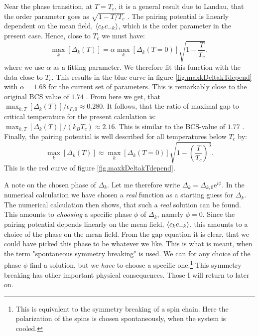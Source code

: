 Near the phase transition, at $T = T_c$, it is a general result due to Landau, that the order parameter goes as $\sqrt{1 - T/T_c}$ \cite{PlischkeStatPhys}. The pairing potential is linearly dependent on the mean field, $\braket{c_kc_{-k}}$, which is the order parameter in the present case. Hence, close to $T_c$ we must have:
\begin{equation}
\max_k[\Delta_k(T)] = \alpha\max_k[\Delta_k(T=0)]\sqrt{1 - \frac{T}{T_c}},  
\label{eq.maxpairingasymp}
\end{equation}
where we use $\alpha$ as a fitting parameter. We therefore fit this function with the data close to $T_c$. This results in the blue curve in figure \ref{fig.maxkDeltakTdepend} with $\alpha = 1.68$ for the current set of parameters. This is remarkably close to the original BCS value of $1.74$ \cite{PlischkeStatPhys}. From here we get, that $\max_{k,T}[\Delta_k(T)]/\epsilon_{F,0} \approx 0.280$. It follows, that the ratio of maximal gap to critical temperature for the present calculation is: $\max_{k,T}[\Delta_k(T)]/(k_B T_c) \approx 2.16$. This is similar to the BCS-value of $1.77$ \cite{BruusFlensberg}. Finally, the pairing potential is well described for all temperatures below $T_c$ by:
\begin{equation}
\max_k[\Delta_k(T)] \approx \max_k[\Delta_k(T=0)]\sqrt{1 - \left(\frac{T}{T_c}\right)^3}.
\label{eq.maxpairingapprox}
\end{equation} 
This is the red curve of figure \ref{fig.maxkDeltakTdepend}. 

A note on the chosen phase of $\Delta_k$. Let me therefore write $\Delta_k = \Delta_{k,0}\text{e}^{i\phi}$. In the numerical calculation we have chosen a \textit{real} function as a starting guess for $\Delta_k$. The numerical calculation then shows, that such a \textit{real} solution can be found. This amounts to \textit{choosing} a specific phase $\phi$ of $\Delta_k$, namely $\phi = 0$. Since the pairing potential depends linearly on the mean field, $\braket{c_kc_{-k}}$, this amounts to a choice of the phase on the mean field. From the gap equation it is clear, that we could have picked this phase to be whatever we like. This is what is meant, when the term "spontaneous symmetry breaking" is used. We can for any choice of the phase $\phi$ find a solution, but we \textit{have} to choose a specific one.\footnote{This is equivalent to the symmetry breaking of a spin chain. Here the polarization of the spins is chosen spontaneously, when the system is cooled.} This symmetry breaking has other important physical consequences. Those I will return to later on. 

